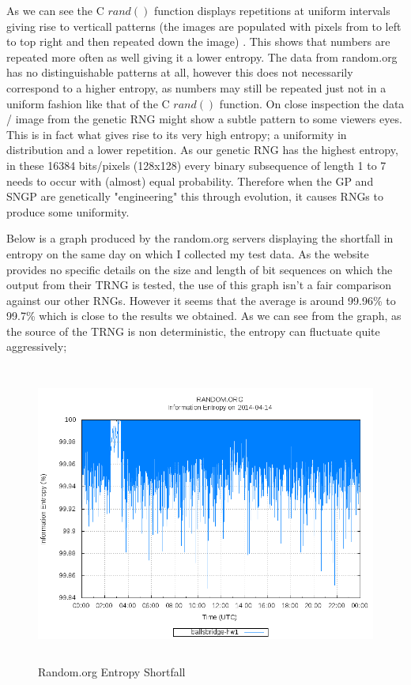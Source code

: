 \documentclass[a4paper,10.5pt]{article}
\begin{document}
As we can see the C $rand()$ function displays repetitions at uniform intervals giving rise to verticall patterns (the images are populated with pixels from to left to top right and then repeated down the image) . This shows that numbers are repeated more often as well giving it a lower entropy. The data from random.org has no distinguishable patterns at all, however this does not necessarily correspond to a higher entropy, as numbers may still be repeated just not in a uniform fashion like that of the C $rand()$ function. On close inspection the data / image from the genetic RNG might show a subtle pattern to some viewers eyes. This is in fact what gives rise to its very high entropy; a uniformity in distribution and a lower repetition. As our genetic RNG has the highest entropy, in these 16384 bits/pixels (128x128) every binary subsequence of length 1 to 7 needs to occur with (almost) equal probability. Therefore when the GP and SNGP are genetically "engineering" this through evolution, it causes RNGs to produce some uniformity.

Below is a graph produced by the random.org servers displaying the shortfall in entropy on the same day on which I collected my test data. As the website provides no specific details on the size and length of bit sequences on which the output from their TRNG is tested, the use of this graph isn't a fair comparison against our other RNGs. However it seems that the average is around 99.96\% to 99.7\% which is close to the results we obtained. As we can see from the graph, as the source of the TRNG is non deterministic, the entropy can fluctuate quite aggressively;

\begin{figure}[H]
\label{trngpic}
\centering
\caption{Random.org Entropy Shortfall}
\includegraphics[keepaspectratio=true, height= 280pt]{trng.png}
\end{figure}
 
\end{document}
